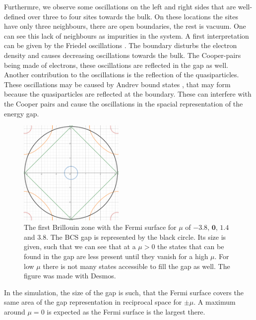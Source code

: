 \documentclass[..\main.tex]{subfile}
\begin{document}
Furthermre, we observe some oscillations on the left and right sides that are well-defined over three to four sites towards the bulk. On these locations the sites have only three
neighbours, there are open boundaries, the rest is vacuum. One can see this lack of neighbours as impurities in the system. 
A first interpretation can be given by the Friedel oscillations \cite{Harrison1970}. The boundary disturbs the electron density and causes decreasing oscillations towards
the bulk. The Cooper-pairs being made of electrons, these oscillations are reflected in the gap as well. Another contribution to the oscillations
is the reflection of the quasiparticles.
These oscillations may be caused by Andrev bound states \cite{Bobkov_2024}, that may form because the quasiparticles are reflected at the boundary.
These can interfere with the Cooper pairs and cause the oscillations in the spacial representation of the energy gap.\\
\begin{figure}[H]
  \centering
  \includegraphics[width=0.45\textwidth]{Ressources/GapBrillouin.png}
  \caption{The first Brillouin zone with the Fermi surface for $\mu$ of \textcolor{Brillou1}{$\bm{-3.8}$}, \textcolor{Brillou2}{$\bm{0}$},
  \textcolor{Brillou3}{$\bm{1.4}$} and \textcolor{Brillou4}{$\bm{3.8}$}. The BCS gap is represented by the black circle. Its size is given, such that 
  we can see that at a $\mu>0$ the states that can be found in the gap are less present until they vanish for a high $\mu$. For low $\mu$ there is
  not many states accessible to fill the gap as well. The figure was made with Desmos.}
  \label{fig:Brillouin}
\end{figure}
In the simulation, the size of the gap is such, that the Fermi surface 
covers the same area of the gap representation in reciprocal space for $\pm\mu$.
A maximum around $\mu=0$ is expected as the Fermi surface is the largest there.   
\end{document}
